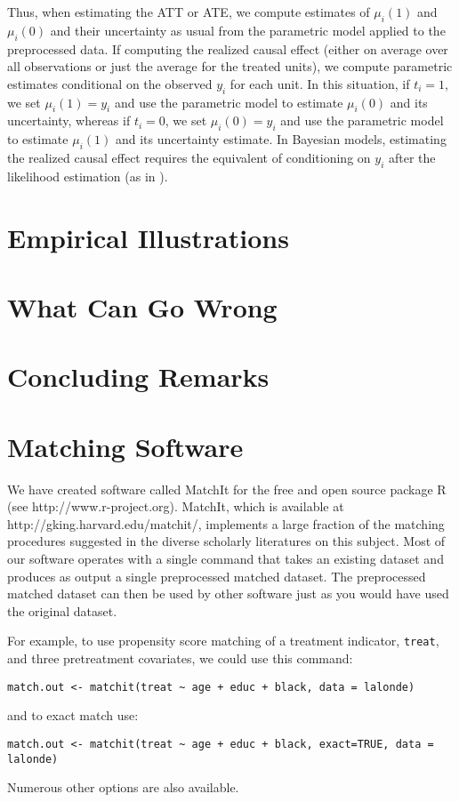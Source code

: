 \documentclass[11pt,titlepage]{article}
\begin{document}
Thus, when estimating the ATT or ATE, we compute estimates of
$\mu_i(1)$ and $\mu_i(0)$ and their uncertainty as usual from the
parametric model applied to the preprocessed data.  If computing the
realized causal effect (either on average over all observations or
just the average for the treated units), we compute parametric
estimates conditional on the observed $y_i$ for each unit.  In this
situation, if $t_i=1$, we set $\mu_i(1)=y_i$ and use the parametric
model to estimate $\mu_i(0)$ and its uncertainty, whereas if $t_i=0$,
we set $\mu_i(0)=y_i$ and use the parametric model to estimate
$\mu_i(1)$ and its uncertainty estimate.  In Bayesian models,
estimating the realized causal effect requires the equivalent of
conditioning on $y_i$ after the likelihood estimation (as in
\citet{King97}).

\section{Empirical Illustrations}

\section{What Can Go Wrong}

\section{Concluding Remarks}

\appendix
\section{Matching Software}

We have created software called MatchIt for the free and open source
package R (see http://www.r-project.org).  MatchIt, which is available
at http://gking.harvard.edu/matchit/, implements a large fraction of
the matching procedures suggested in the diverse scholarly literatures
on this subject.  Most of our software operates with a single command
that takes an existing dataset and produces as output a single
preprocessed matched dataset.  The preprocessed matched dataset can
then be used by other software just as you would have used the
original dataset.

For example, to use propensity score matching of a treatment
indicator, \texttt{treat}, and three pretreatment covariates, we could
use this command:
\begin{verbatim}
match.out <- matchit(treat ~ age + educ + black, data = lalonde)
\end{verbatim}
and to exact match use:
\begin{verbatim}
match.out <- matchit(treat ~ age + educ + black, exact=TRUE, data = lalonde)
\end{verbatim}
Numerous other options are also available.
\end{document}
